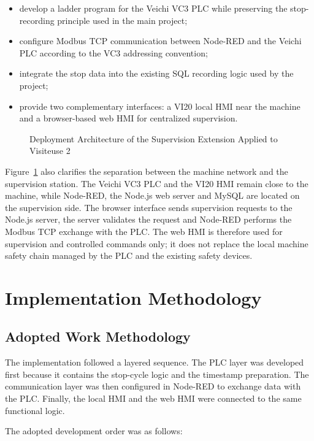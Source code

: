 \begin{itemize}[leftmargin=1.1cm]
  \item develop a ladder program for the Veichi VC3 PLC while preserving the stop-recording principle used in the main project;
  \item configure Modbus TCP communication between Node-RED and the Veichi PLC according to the VC3 addressing convention;
  \item integrate the stop data into the existing SQL recording logic used by the project;
  \item provide two complementary interfaces: a VI20 local HMI near the machine and a browser-based web HMI for centralized supervision.
\end{itemize}

\begin{figure}[H]
\centering
{}
\caption{Deployment Architecture of the Supervision Extension Applied to Visiteuse 2}
\label{fig:chapter4-1}
\end{figure}

Figure~\ref{fig:chapter4-1} also clarifies the separation between the machine network and the supervision station. The Veichi VC3 PLC and the VI20 HMI remain close to the machine, while Node-RED, the Node.js web server and MySQL are located on the supervision side. The browser interface sends supervision requests to the Node.js server, the server validates the request and Node-RED performs the Modbus TCP exchange with the PLC. The web HMI is therefore used for supervision and controlled commands only; it does not replace the local machine safety chain managed by the PLC and the existing safety devices.

\section{Implementation Methodology}

\subsection{Adopted Work Methodology}
The implementation followed a layered sequence. The PLC layer was developed first because it contains the stop-cycle logic and the timestamp preparation. The communication layer was then configured in Node-RED to exchange data with the PLC. Finally, the local HMI and the web HMI were connected to the same functional logic.

The adopted development order was as follows:

